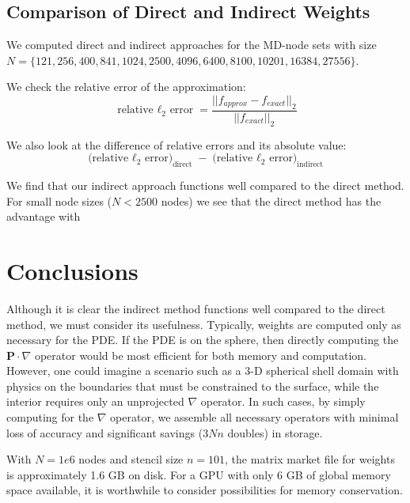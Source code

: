 


\subsection{Comparison of Direct and Indirect Weights} 

We computed direct and indirect approaches for the MD-node sets with size $N = \{121, 256, 400, 841, 1024, 2500, 4096, 6400, 8100, 10201, 16384, 27556\}$.

We check the relative error of the approximation: 
$$ \text{relative $\ell_{2}$ error} = \frac{|| f_{approx} - f_{exact} ||_{2} }{ || f_{exact} ||_{2} } $$ 

We also look at the difference of relative errors and its absolute value: 
$$
\text{(relative $\ell_{2}$ error)}_{\text{direct}} - \text{(relative $\ell_{2}$ error)}_{\text{indirect}}
$$

We find that our indirect approach functions well compared to the direct method. For small node sizes ($N < 2500$ nodes) we see that the direct method has the advantage with 

\section{Conclusions}

Although it is clear the indirect method functions well compared to the direct method, we must consider its usefulness. Typically, weights are computed only as necessary for the PDE. If the PDE is on the sphere, then directly computing the $\mathbf{P}\cdot \nabla$ operator would be most efficient for both memory and computation. However, one could imagine a scenario such as a 3-D spherical shell domain with physics on the boundaries that must be constrained to the surface, while the interior requires only an unprojected $\nabla$ operator. In such cases, by simply computing for the $\nabla$ operator, we assemble all necessary operators with minimal loss of accuracy and significant savings ($3Nn$ doubles) in storage. 


With $N=1e6$ nodes and stencil size $n=101$, the matrix market file for weights is approximately 1.6 GB on disk. For a GPU with only 6 GB of global memory space available, it is worthwhile to consider possibilities for memory conservation. 




%
%
%

